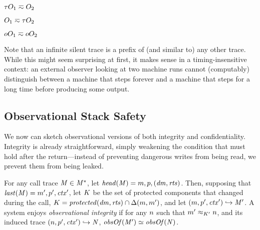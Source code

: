 \documentclass[acmsmall,review,anonymous]{acmart}\settopmatter{printfolios=true,printccs=false,printacmref=false}
\begin{document}
\begin{minipage}{.2\textwidth}
  \judgment{}{\(\obsT \eqsim \obsT\)}
\end{minipage}
\begin{minipage}{.2\textwidth}
           {\(\tau O_1 \eqsim O_2\)}
\end{minipage}
\begin{minipage}{.2\textwidth}
           {\(O_1 \eqsim \tau O_2\)}
\end{minipage}
\begin{minipage}{.2\textwidth}
           {\(oO_1 \eqsim oO_2\)}
\end{minipage}



Note that an infinite silent trace is a
prefix of (and similar to) any other trace. While this might seem
surprising at first, it makes sense in a timing-insensitive context:
an external observer looking at two machine runs cannot (computably)
distinguish between a machine that steps forever and a machine that
steps for a long time before producing some output.

\subsection{Observational Stack Safety}

We now can sketch observational versions of both integrity and confidentiality.
Integrity is already straightforward, simply weakening the condition that must hold
after the return---instead of preventing dangerous writes from being read, we
prevent them from being leaked.

For any call trace \(\mathit{M} \in \mathit{M}^*\),
let \(\mathit{head}(\mathit{M}) = m,p,(\mathit{dm},\mathit{rts})\).
%
Then, supposing that \(\mathit{last}(\mathit{M}) = m',p',\mathit{ctx}'\),
let \(K\) be the set of protected components that changed during
the call, \(K = \mathit{protected}(\mathit{dm},\mathit{rts}) \cap \Delta(m, m')\),
and let \((m,p',\mathit{ctx}') \hookrightarrow \mathit{M}'\).
A system enjoys {\em observational integrity} if for any \(n\) such that
\(m' \approx_{K'} n\), and its induced trace
\((n,p',\mathit{ctx}') \hookrightarrow \mathit{N}\), \(\mathit{obsOf}(\mathit{M}') \simeq \mathit{obsOf}(\mathit{N})\).
\end{document}
